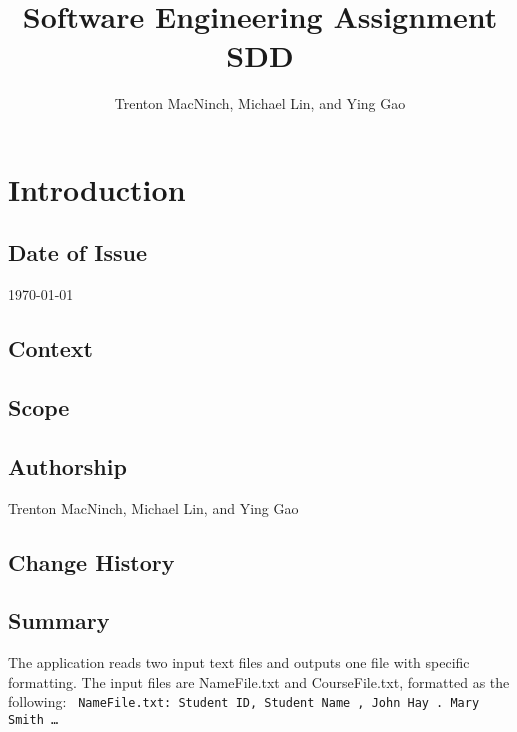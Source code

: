 \documentclass{article}
\title{\textbf{Software Engineering Assignment SDD}}
\author{Trenton MacNinch, Michael Lin, and Ying Gao}
\begin{document}
\maketitle
\newpage

\tableofcontents
\newpage

\section{Introduction}
\subsection{Date of Issue}
\today
\subsection{Context}
\subsection{Scope}
\subsection{Authorship}
Trenton MacNinch, Michael Lin, and Ying Gao
\subsection{Change History}
\subsection{Summary}
The application reads two input text files and outputs one file with specific formatting.
The input files are NameFile.txt and CourseFile.txt, formatted as the following:
\texttt{ \newline
  NameFile.txt: \newline
  Student ID, Student Name , John Hay . Mary Smith \newline
  \ldots
}
\end{document}
